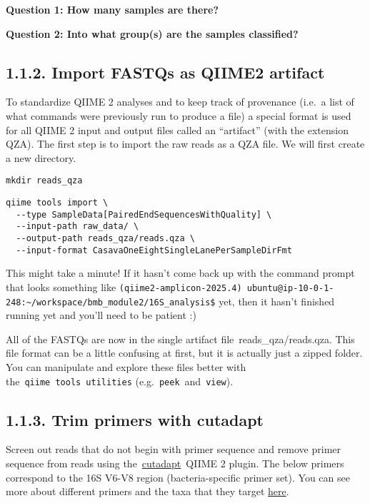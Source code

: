 \documentclass[
]{book}
\begin{document}
\textbf{Question 1: How many samples are there?}

\textbf{Question 2: Into what group(s) are the samples classified?}

\subsection{1.1.2. Import FASTQs as QIIME2 artifact}\label{import-fastqs-as-qiime2-artifact}

To standardize QIIME 2 analyses and to keep track of provenance (i.e.~a list of what commands were previously run to produce a file) a special format is used for all QIIME 2 input and output files called an ``artifact'' (with the extension QZA). The first step is to import the raw reads as a QZA file. We will first create a new directory.

\begin{verbatim}
mkdir reads_qza
\end{verbatim}

\begin{verbatim}
qiime tools import \
  --type SampleData[PairedEndSequencesWithQuality] \
  --input-path raw_data/ \
  --output-path reads_qza/reads.qza \
  --input-format CasavaOneEightSingleLanePerSampleDirFmt
\end{verbatim}

This might take a minute! If it hasn't come back up with the command prompt that looks something like \texttt{(qiime2-amplicon-2025.4)\ ubuntu@ip-10-0-1-248:\textasciitilde{}/workspace/bmb\_module2/16S\_analysis\$} yet, then it hasn't finished running yet and you'll need to be patient :)

All of the FASTQs are now in the single artifact file~reads\_qza/reads.qza. This file format can be a little confusing at first, but it is actually just a zipped folder. You can manipulate and explore these files better with the~\texttt{qiime\ tools~utilities} (e.g.~\texttt{peek}~and~\texttt{view}).

\subsection{1.1.3. Trim primers with cutadapt}\label{trim-primers-with-cutadapt}

Screen out reads that do not begin with primer sequence and remove primer sequence from reads using the~\href{http://cutadapt.readthedocs.io/en/stable/guide.html}{cutadapt}~QIIME 2 plugin. The below primers correspond to the 16S V6-V8 region (bacteria-specific primer set). You can see more about different primers and the taxa that they target \href{https://imr.bio/protocols.html}{here}.
\end{document}
